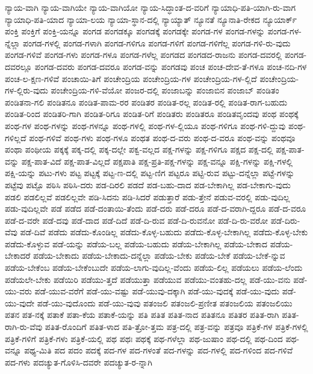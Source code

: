 {ನ್ಯಾಯ-ವಾಗಿ
ನ್ಯಾಯ-ವಾಗಿಯೇ
ನ್ಯಾಯ-ವಾಗಿಯೋ
ನ್ಯಾಯ-ಸಿದ್ಧಾಂತ-ದ-ವರಿಗೆ
ನ್ಯಾಯಾಧಿ-ಪತಿ-ಯಾಗಿ-ರು-ವಾಗ
ನ್ಯಾಯಾಧಿ-ಪತಿ-ಯಾದ
ನ್ಯಾಯಾ-ಲಯ
ನ್ಯಾಯಾ-ಸ್ಥಾನ-ದಲ್ಲಿ
ನ್ಯಾಯ್ಯಾತ್
ನ್ಯೂನತೆ
ನ್ಯೂನಾತಿ-ರೇಕದ
ನ್ಯೂಯಾರ್ಕ್
ಪಂಕ್ತಿ
ಪಂಕ್ತಿಗೆ
ಪಂಕ್ತಿ-ಯನ್ನೂ
ಪಂಗಡ
ಪಂಗಡಕ್ಕೂ
ಪಂಗಡಕ್ಕೆ
ಪಂಗಡಕ್ಕೇ
ಪಂಗಡ-ಗಳ
ಪಂಗಡ-ಗಳನ್ನು
ಪಂಗಡ-ಗಳ-ನ್ನೆಲ್ಲಾ
ಪಂಗಡ-ಗಳಲ್ಲಿ
ಪಂಗಡ-ಗಳಾಗಿ
ಪಂಗಡ-ಗಳಿಗೂ
ಪಂಗಡ-ಗಳಿಗೆ
ಪಂಗಡ-ಗಳಿಗೆಲ್ಲ
ಪಂಗಡ-ಗಳಿ-ರು-ವುದು
ಪಂಗಡ-ಗಳಿವೆ
ಪಂಗಡ-ಗಳು
ಪಂಗಡ-ಗಳೂ
ಪಂಗಡ-ಗಳೆಲ್ಲ
ಪಂಗಡದ
ಪಂಗಡದ-ರಾಜನು
ಪಂಗಡ-ದವರಲ್ಲಿ
ಪಂಗಡ-ದವರಲ್ಲೂ
ಪಂಗಡ-ದವರು
ಪಂಗಡ-ದವರೂ
ಪಂಗಡ-ವನ್ನು
ಪಂಗಡವು
ಪಂಚ
ಪಂಚ-ದೇವ-ತೆ-ಗಳೂ
ಪಂಚ-ನದಿ-ಗಳ
ಪಂಚ-ಲ-ಕ್ಷಣ-ಗಳಿವೆ
ಪಂಚಾಯಿ-ತಿಗೆ
ಪಂಚೇಂದ್ರಿಯ
ಪಂಚೇಂದ್ರಿಯ-ಗಳ
ಪಂಚೇಂದ್ರಿಯ-ಗಳ-ಲ್ಲಿದೆ
ಪಂಚೇಂದ್ರಿಯ-ಗಳ-ಲ್ಲಿರು-ವುದು
ಪಂಚೇಂದ್ರಿಯ-ಗಳಿ-ವೆಯೋ
ಪಂಜರ-ದಲ್ಲಿ
ಪಂಜಾಬನ್ನು
ಪಂಜಾಬಿನ
ಪಂಜಾಬ್
ಪಂಡಿತಂ
ಪಂಡಿತನಾ-ಗಲಿ
ಪಂಡಿತನೂ
ಪಂಡಿತ-ಪಾಮ-ರರ
ಪಂಡಿತರ
ಪಂಡಿತ-ರಲ್ಲ
ಪಂಡಿತ-ರಲ್ಲಿ
ಪಂಡಿತ-ರಾಗ-ಬಹುದು
ಪಂಡಿತ-ರಿಂದ
ಪಂಡಿತರಿ-ಗಾಗಿ
ಪಂಡಿತ-ರಿಗೂ
ಪಂಡಿತ-ರಿಗೆ
ಪಂಡಿತರು
ಪಂಡಿತರೂ
ಪಂಡಿತವೃಂದವು
ಪಂಥ
ಪಂಥಕ್ಕೆ
ಪಂಥ-ಗಳ
ಪಂಥ-ಗಳನ್ನು
ಪಂಥ-ಗಳನ್ನೂ
ಪಂಥ-ಗಳಲ್ಲಿ
ಪಂಥ-ಗಳ-ಲ್ಲಿಯೂ
ಪಂಥ-ಗಳಿಗೂ
ಪಂಥ-ಗಳಿ-ದ್ದುವು
ಪಂಥ-ಗಳಿಲ್ಲದೆ
ಪಂಥ-ಗಳಿವೆ
ಪಂಥ-ಗಳು
ಪಂಥ-ಗಳೂ
ಪಂಥತ
ಪಂಥ-ದ-ವರು
ಪಂಥ-ದ-ವರೂ
ಪಂಥ-ವನ್ನು
ಪಂಥವೂ
ಪಂಥಾ
ಪಂಥೀಯ
ಪಕ್ಕಕ್ಕೆ
ಪಕ್ಕ-ದಲ್ಲಿ
ಪಕ್ಕ-ದಲ್ಲೇ
ಪಕ್ವ-ವಲ್ಲದ
ಪಕ್ಷ-ಗಳನ್ನು
ಪಕ್ಷ-ಗಳಿಗೂ
ಪಕ್ಷದ
ಪಕ್ಷ-ದಲ್ಲಿ
ಪಕ್ಷ-ಪಾತ-ವನ್ನು
ಪಕ್ಷ-ಪಾತ-ವಿದೆ
ಪಕ್ಷ-ಪಾತ-ವಿಲ್ಲದೆ
ಪಕ್ಷಪಾತಿ
ಪಕ್ಷ-ಪ್ರತಿ-ಪಕ್ಷ-ಗಳನ್ನು
ಪಕ್ಷ-ವನ್ನೂ
ಪಕ್ಷಿ-ಗಳನ್ನು
ಪಕ್ಷಿ-ಗಳಲ್ಲಿ
ಪಕ್ಷಿ-ಯನ್ನು
ಪಟು-ಗಳು
ಪಟ್ಟ
ಪಟ್ಟಕ್ಕೆ
ಪಟ್ಟ-ಣ-ದಲ್ಲಿ
ಪಟ್ಟ-ಣಿಗ
ಪಟ್ಟರೂ
ಪಟ್ಟಿ-ರುವ
ಪಟ್ಟು-ದನ್ನೆಲ್ಲಾ
ಪಟ್ಟೆ-ಗಳನ್ನು
ಪಟ್ಟೆವು
ಪಟ್ಟೊ
ಪಠಿಸಿ
ಪಠಿಸಿ-ದರು
ಪಡ-ದಿರಲಿ
ಪಡದೆ
ಪಡ-ಬಹು-ದಾದ
ಪಡ-ಬೇಕಾಗಿಲ್ಲ
ಪಡ-ಬೇಕಾಗು-ವುದು
ಪಡಲಿ
ಪಡಲಿಲ್ಲವೆ
ಪಡಲಿಲ್ಲವೇ
ಪಡಿ-ಸಿದನು
ಪಡಿ-ಸಿದರೆ
ಪಡುತ್ತಾರೆ
ಪಡು-ತ್ತೇನೆ
ಪಡುವ-ವರಲ್ಲಿ
ಪಡು-ವುದಿಲ್ಲ
ಪಡು-ವುದಿಲ್ಲವೇ
ಪಡೆ
ಪಡೆದ
ಪಡೆ-ದಂತಾಯಿ-ತೆಂದು
ಪಡೆ-ದರು
ಪಡೆ-ದರೂ
ಪಡೆ-ದ-ವರಾಗಿ-ದ್ದರೂ
ಪಡೆ-ದ-ವರೂ
ಪಡೆ-ದ-ವರೇ
ಪಡೆ-ದವು
ಪಡೆ-ದಾದ
ಪಡೆ-ದಿದೆ
ಪಡೆ-ದಿ-ರುವ
ಪಡೆ-ದಿ-ರುವನೋ
ಪಡೆ-ದಿ-ರು-ವರೋ
ಪಡೆ-ದಿರು-ವೆವು
ಪಡೆ-ದಿವೆ
ಪಡೆದು
ಪಡೆದು-ಕೊಂಡಿಲ್ಲ
ಪಡೆದು-ಕೊಳ್ಳ-ಬಹುದು
ಪಡೆದು-ಕೊಳ್ಳ-ಬೇಕಾಗಿಲ್ಲ
ಪಡೆದು-ಕೊಳ್ಳ-ಬೇಕು
ಪಡೆದು-ಕೊಳ್ಳುವ
ಪಡೆ-ಯನ್ನು
ಪಡೆಯ-ಬಲ್ಲ
ಪಡೆಯ-ಬಹುದು
ಪಡೆಯ-ಬೇಕಾಗಿಲ್ಲ
ಪಡೆಯ-ಬೇಕಾದ
ಪಡೆಯ-ಬೇಕಾದರೆ
ಪಡೆಯ-ಬೇಕಾದು
ಪಡೆಯ-ಬೇಕಾದು-ದನ್ನೆಲ್ಲಾ
ಪಡೆಯ-ಬೇಕು
ಪಡೆಯ-ಬೇಕೆ
ಪಡೆಯ-ಬೇಕೆ-ನ್ನುವ
ಪಡೆಯ-ಬೇಕೆಂಬ
ಪಡೆಯ-ಬೇಕೆಂಬುದೇ
ಪಡೆಯ-ಲಾಗು-ವುದಿಲ್ಲ-ವೆಂದು
ಪಡೆಯ-ಲಿಲ್ಲ
ಪಡೆಯಲು
ಪಡೆಯ-ಲೆಂದು
ಪಡೆಯಲೇ-ಬೇಕು
ಪಡೆಯಿರಿ
ಪಡೆಯು-ತ್ತದೆ
ಪಡೆಯುತ್ತಾ
ಪಡೆಯುವ
ಪಡೆಯು-ವಂತಹು-ದಲ್ಲ
ಪಡೆ-ಯು-ವನು
ಪಡೆ-ಯು-ವರು
ಪಡೆ-ಯುವ-ವರೆಗೆ
ಪಡೆ-ಯು-ವಷ್ಟು
ಪಡೆ-ಯುವು-ದಕ್ಕಾಗಿ
ಪಡೆ-ಯು-ವುದಕ್ಕೆ
ಪಡೆ-ಯು-ವುದು
ಪಡೆ-ಯು-ವುದೇ
ಪಡೆ-ಯು-ವುದೊಂದು
ಪಡೆ-ಯು-ವುವು
ಪತಂಜಲಿ
ಪತಂಜಲಿ-ಪ್ರಣೀತ
ಪತಂಜಲಿಯ
ಪತಂಜಲಿಯು
ಪತನ
ಪತ-ನಕ್ಕೆ
ಪತಾಕೆ
ಪತಾ-ಕೆಯ
ಪತಾಕೆ-ಯನ್ನು
ಪತಿ
ಪತಿತ
ಪತಿತ-ನಾದ
ಪತಿತನೂ
ಪತಿತರ
ಪತಿತ-ರಾಗಿ
ಪತಿತ-ರಾಗಿ-ರು-ವೆವು
ಪತಿತ-ರೊಂದಿಗೆ
ಪತಿತ-ಳಾದ
ಪತಿ-ತ್ರೋ-ತ್ತಮ
ಪತ್ರ-ದಲ್ಲಿ
ಪತ್ರ-ವನ್ನು
ಪತ್ರವೂ
ಪತ್ರಿಕೆ-ಗಳ
ಪತ್ರಿಕೆ-ಗಳಲ್ಲಿ
ಪತ್ರಿಕೆ-ಗಳಿಗೆ
ಪತ್ರಿಕೆ-ಗಳು
ಪತ್ರಿಕೆ-ಯಲ್ಲಿ
ಪಥ
ಪಥಃ
ಪಥಕ್ಕೆ
ಪಥ-ಗಳೆಲ್ಲಾ
ಪಥ-ಜುಷಾಂ
ಪಥ-ದಲ್ಲಿ
ಪಥ-ದಿಂದ
ಪಥ-ವನ್ನೂ
ಪಥ್ಯ-ಮಿತಿ
ಪದ
ಪದಂ
ಪದಕ್ಕೆ
ಪದ-ಗಳ
ಪದ-ಗಳಂತೆ
ಪದ-ಗಳನ್ನು
ಪದ-ಗಳಲ್ಲಿ
ಪದ-ಗಳಿಂದ
ಪದ-ಗಳಿವೆ
ಪದ-ಗಳು
ಪದಚ್ಯುತ-ಗೊಳಿಸಿ-ದವರೇ
ಪದಚ್ಯುತ-ರ-ನ್ನಾಗಿ
}
